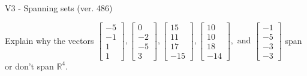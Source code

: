 \begin{exercise}
  \begin{exerciseTitle}V3 - Spanning sets (ver. 486)\end{exerciseTitle}
  \begin{exerciseStatement}
    Explain why the vectors \(\left[\begin{array}{r}
-5 \\
-1 \\
1 \\
1
\end{array}\right] , \left[\begin{array}{r}
0 \\
-2 \\
-5 \\
3
\end{array}\right] , \left[\begin{array}{r}
15 \\
11 \\
17 \\
-15
\end{array}\right] , \left[\begin{array}{r}
10 \\
10 \\
18 \\
-14
\end{array}\right] , \text{ and } \left[\begin{array}{r}
-1 \\
-5 \\
-3 \\
-3
\end{array}\right]\) span or don't span \(\mathbb{R}^4\). 
	



\end{exerciseStatement}
\end{exercise}
